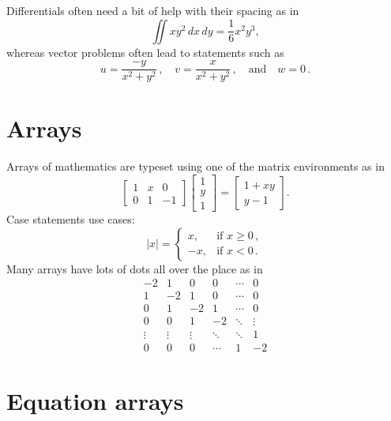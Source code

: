 \documentclass[11pt,a4paper,oldfontcommands]{memoir}
\begin{document}
Differentials often need a bit of help with their spacing as in
\[
  \iint xy^2\,dx\,dy 
  =\frac{1}{6}x^2y^3,
\]
whereas vector problems often lead to statements such as
\[
  u=\frac{-y}{x^2+y^2}\,,\quad
  v=\frac{x}{x^2+y^2}\,,\quad\text{and}\quad
  w=0\,.
\]







\section{Arrays}

Arrays of mathematics are typeset using one of the matrix environments as 
in
\[
  \begin{bmatrix}
    1 & x & 0 \\
    0 & 1 & -1
  \end{bmatrix}\begin{bmatrix}
    1  \\
    y  \\
    1
  \end{bmatrix}
  =\begin{bmatrix}
    1+xy  \\
    y-1
  \end{bmatrix}.
\]
Case statements use cases:
\[
  |x|=\begin{cases}
    x, & \text{if }x\geq 0\,,  \\
    -x, & \text{if }x< 0\,.
  \end{cases}
\]
Many arrays have lots of dots all over the place as in
\[
  \begin{matrix}
    -2 & 1 & 0 & 0 & \cdots & 0  \\
    1 & -2 & 1 & 0 & \cdots & 0  \\
    0 & 1 & -2 & 1 & \cdots & 0  \\
    0 & 0 & 1 & -2 & \ddots & \vdots \\
    \vdots & \vdots & \vdots & \ddots & \ddots & 1  \\
    0 & 0 & 0 & \cdots & 1 & -2
  \end{matrix}
\]






\section{Equation arrays}
\end{document}
